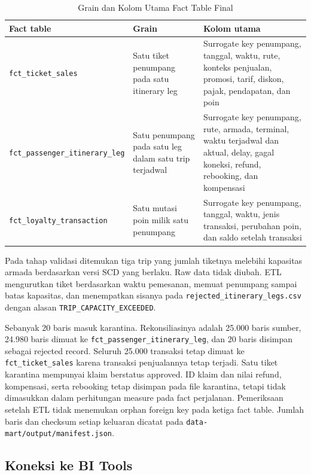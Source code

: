 \begin{table}[htbp]
\centering
\small
\caption{Grain dan Kolom Utama Fact Table Final}
\begin{tabular}{|p{}|p{}|p{}|}
\hline
\textbf{Fact table} & \textbf{Grain} & \textbf{Kolom utama} \\
\hline
\texttt{fct\_ticket\_sales} & Satu tiket penumpang pada satu itinerary leg &
Surrogate key penumpang, tanggal, waktu, rute, konteks penjualan, promosi,
tarif, diskon, pajak, pendapatan, dan poin \\
\hline
\texttt{fct\_passenger\_itinerary\_leg} & Satu penumpang pada satu leg dalam
satu trip terjadwal & Surrogate key penumpang, rute, armada, terminal, waktu
terjadwal dan aktual, delay, gagal koneksi, refund, rebooking, dan kompensasi \\
\hline
\texttt{fct\_loyalty\_transaction} & Satu mutasi poin milik satu penumpang &
Surrogate key penumpang, tanggal, waktu, jenis transaksi, perubahan poin, dan
saldo setelah transaksi \\
\hline
\end{tabular}
\end{table}

Pada tahap validasi ditemukan tiga trip yang jumlah tiketnya melebihi kapasitas
armada berdasarkan versi SCD yang berlaku. Raw data tidak diubah. ETL mengurutkan
tiket berdasarkan waktu pemesanan, memuat penumpang sampai batas kapasitas, dan
menempatkan sisanya pada \texttt{rejected\_itinerary\_legs.csv} dengan alasan
\texttt{TRIP\_CAPACITY\_EXCEEDED}.

Sebanyak 20 baris masuk karantina. Rekonsiliasinya adalah 25.000 baris sumber,
24.980 baris dimuat ke \texttt{fct\_passenger\_itinerary\_leg}, dan 20 baris
disimpan sebagai rejected record. Seluruh 25.000 transaksi tetap dimuat ke
\texttt{fct\_ticket\_sales} karena transaksi penjualannya tetap terjadi.
Satu tiket karantina mempunyai klaim berstatus approved. ID klaim dan nilai
refund, kompensasi, serta rebooking tetap disimpan pada file karantina, tetapi
tidak dimasukkan dalam perhitungan measure pada fact perjalanan.
Pemeriksaan setelah ETL tidak menemukan orphan foreign key pada ketiga fact
table. Jumlah baris dan checksum setiap keluaran dicatat pada
\texttt{data-mart/output/manifest.json}.

\subsection{Koneksi ke BI Tools}


